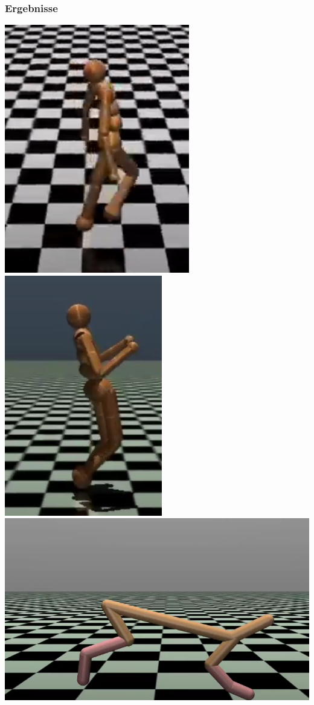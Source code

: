 \begin{frame}
    \frametitle{Ergebnisse}
    \includegraphics[width=.3\textwidth, height=0.4\textheight]{figures/rllab/Humanoid-v1.PNG}\hfill
    \includegraphics[width=.3\textwidth, height=0.4\textheight]{figures/rllab/Humanoid-v2.PNG}\hfill
    \includegraphics[width=.3\textwidth, height=0.4\textheight]{figures/rllab/halcheeathPNG.PNG}


\end{frame}
